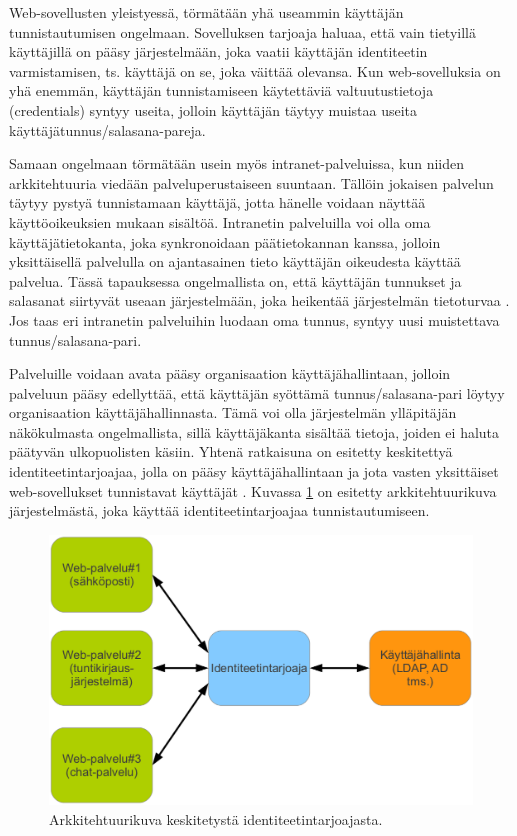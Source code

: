 Web-sovellusten yleistyessä, törmätään yhä useammin käyttäjän tunnistautumisen ongelmaan. Sovelluksen tarjoaja haluaa, että vain tietyillä käyttäjillä on pääsy järjestelmään, joka vaatii käyttäjän identiteetin varmistamisen, ts. käyttäjä on se, joka väittää olevansa. Kun web-sovelluksia on yhä enemmän, käyttäjän tunnistamiseen käytettäviä valtuutustietoja (credentials) syntyy useita, jolloin käyttäjän täytyy muistaa useita käyttäjätunnus/salasana-pareja.

Samaan ongelmaan törmätään usein myös intranet-palveluissa, kun niiden arkkitehtuuria viedään palveluperustaiseen suuntaan. Tällöin jokaisen palvelun täytyy pystyä tunnistamaan käyttäjä, jotta hänelle voidaan näyttää käyttöoikeuksien mukaan sisältöä. Intranetin palveluilla voi olla oma käyttäjätietokanta, joka synkronoidaan päätietokannan kanssa, jolloin yksittäisellä palvelulla on ajantasainen tieto käyttäjän oikeudesta käyttää palvelua. Tässä tapauksessa ongelmallista on, että käyttäjän tunnukset ja salasanat siirtyvät useaan järjestelmään, joka heikentää järjestelmän tietoturvaa \cite{nisti}. Jos taas eri intranetin palveluihin luodaan oma tunnus, syntyy uusi muistettava tunnus/salasana-pari.

Palveluille voidaan avata pääsy organisaation käyttäjähallintaan, jolloin palveluun pääsy edellyttää, että käyttäjän syöttämä tunnus/salasana-pari löytyy organisaation käyttäjähallinnasta. Tämä voi olla järjestelmän ylläpitäjän näkökulmasta ongelmallista, sillä käyttäjäkanta sisältää tietoja, joiden ei haluta päätyvän ulkopuolisten käsiin. Yhtenä ratkaisuna on esitetty keskitettyä identiteetintarjoajaa, jolla on pääsy käyttäjähallintaan ja jota vasten yksittäiset web-sovellukset tunnistavat käyttäjät \cite{nisti}. Kuvassa \ref{johdanto_kuva} on esitetty arkkitehtuurikuva järjestelmästä, joka käyttää identiteetintarjoajaa tunnistautumiseen.

\begin{figure}[ht]
\centering
\includegraphics[width=.7\textwidth]{misc/johdanto_kuva.eps}
\caption{Arkkitehtuurikuva keskitetystä identiteetintarjoajasta.}%
\label{johdanto_kuva}
\end{figure}

